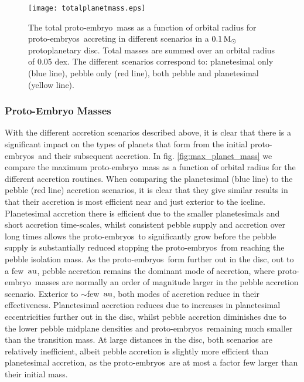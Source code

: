 \documentclass[a4paper,fleqn,usenatbib]{mnras}
\newcommand{\msun}{{\, {\rm M}_{\odot}}}
\newcommand{\au}{{\, {\rm au}}}
\newcommand{\emb}{{{proto-embryo~}}}
\newcommand{\embs}{{{proto-embryos~}}}
\begin{document}
\begin{figure}
\centering
\texttt{[image: totalplanetmass.eps]}
\caption{The total \emb mass as a function of orbital radius for \embs accreting in different scenarios in a $0.1 \msun$ protoplanetary disc. Total masses are summed over an orbital radius of 0.05 dex. The different scenarios correspond to: planetesimal only (blue line), pebble only (red line), both pebble and planetesimal (yellow line).}
\label{fig:total_planet_mass}
\end{figure}

\subsubsection{Proto-Embryo Masses}

With the different accretion scenarios described above, it is clear that there is a significant impact on the types of planets that form from the initial \embs and their subsequent accretion.
In fig. \ref{fig:max_planet_mass} we compare the maximum \emb mass as a function of orbital radius for the different accretion routines.
When comparing the planetesimal (blue line) to the pebble (red line) accretion scenarios, it is clear that they give similar results in that their accretion is most efficient near and just exterior to the iceline.
Planetesimal accretion there is efficient due to the smaller planetesimals and short accretion time-scales, whilst consistent pebble supply and accretion over long times allows the \embs to significantly grow before the pebble supply is substantially reduced stopping the \embs from reaching the pebble isolation mass.
As the \embs form further out in the disc, out to a few $\au$, pebble accretion remains the dominant mode of accretion, where \emb masses are normally an order of magnitude larger in the pebble accretion scenario.
Exterior to $\sim$few $\au$, both modes of accretion reduce in their effectiveness.
Planetesimal accretion reduces due to increases in planetesimal eccentricities further out in the disc, whilst pebble accretion diminishes due to the lower pebble midplane densities and \embs remaining much smaller than the transition mass.
At large distances in the disc, both scenarios are relatively inefficient, albeit pebble accretion is slightly more efficient than planetesimal accretion, as the \embs are at most a factor few larger than their initial mass.
\end{document}
